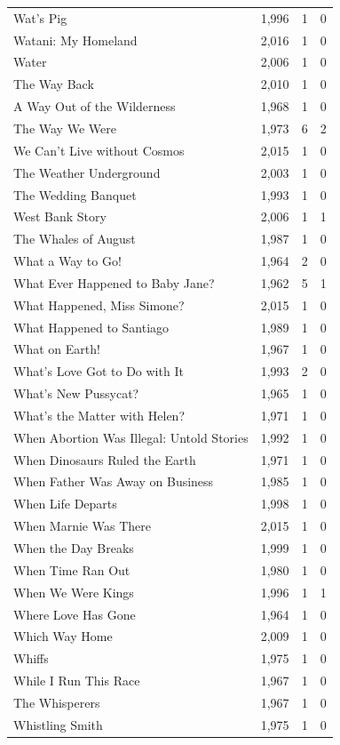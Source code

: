 \begin{tabular}{lrrr}
Wat's Pig & 1,996 & 1 & 0 \\
Watani: My Homeland & 2,016 & 1 & 0 \\
Water & 2,006 & 1 & 0 \\
The Way Back & 2,010 & 1 & 0 \\
A Way Out of the Wilderness & 1,968 & 1 & 0 \\
The Way We Were & 1,973 & 6 & 2 \\
We Can't Live without Cosmos & 2,015 & 1 & 0 \\
The Weather Underground & 2,003 & 1 & 0 \\
The Wedding Banquet & 1,993 & 1 & 0 \\
West Bank Story & 2,006 & 1 & 1 \\
The Whales of August & 1,987 & 1 & 0 \\
What a Way to Go! & 1,964 & 2 & 0 \\
What Ever Happened to Baby Jane? & 1,962 & 5 & 1 \\
What Happened, Miss Simone? & 2,015 & 1 & 0 \\
What Happened to Santiago & 1,989 & 1 & 0 \\
What on Earth! & 1,967 & 1 & 0 \\
What's Love Got to Do with It & 1,993 & 2 & 0 \\
What's New Pussycat? & 1,965 & 1 & 0 \\
What's the Matter with Helen? & 1,971 & 1 & 0 \\
When Abortion Was Illegal: Untold Stories & 1,992 & 1 & 0 \\
When Dinosaurs Ruled the Earth & 1,971 & 1 & 0 \\
When Father Was Away on Business & 1,985 & 1 & 0 \\
When Life Departs & 1,998 & 1 & 0 \\
When Marnie Was There & 2,015 & 1 & 0 \\
When the Day Breaks & 1,999 & 1 & 0 \\
When Time Ran Out & 1,980 & 1 & 0 \\
When We Were Kings & 1,996 & 1 & 1 \\
Where Love Has Gone & 1,964 & 1 & 0 \\
Which Way Home & 2,009 & 1 & 0 \\
Whiffs & 1,975 & 1 & 0 \\
While I Run This Race & 1,967 & 1 & 0 \\
The Whisperers & 1,967 & 1 & 0 \\
Whistling Smith & 1,975 & 1 & 0 \\

\end{tabular}
